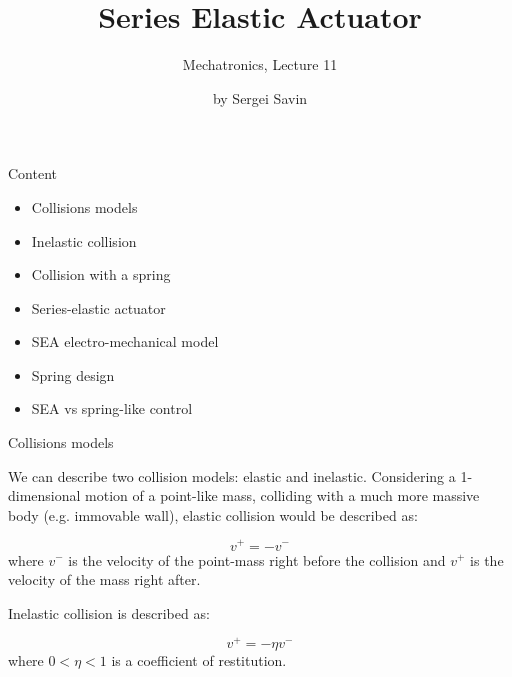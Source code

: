 \documentclass{beamer}
\title{Series Elastic Actuator}
\subtitle{Mechatronics, Lecture 11}
\author{by Sergei Savin}
\date{\mydate}
\begin{document}
\maketitle



\begin{frame}{Content}
\begin{itemize}
	\item Collisions models
	\item Inelastic collision
	\item Collision with a spring
	\item Series-elastic actuator
	\item SEA electro-mechanical model
	\item Spring design
	\item SEA vs spring-like control
\end{itemize}
\end{frame}




\begin{frame}{Collisions models}
	\begin{flushleft}
		
		We can describe two collision models: elastic and inelastic. Considering a 1-dimensional motion of a point-like mass, colliding with a much more massive body (e.g. immovable wall), elastic collision would be described as:
		
		\begin{equation}
			v^+ = -v^-
		\end{equation}
		where $v^-$ is the velocity of the point-mass right before the collision and $v^+$ is the velocity of the mass right after.
		
		\bigskip
		
		Inelastic collision is described as:
		
		\begin{equation}
			v^+ = -\eta v^-
		\end{equation}
		where $0 < \eta < 1$ is a coefficient of restitution.
		
	\end{flushleft}
\end{frame}
\end{document}
